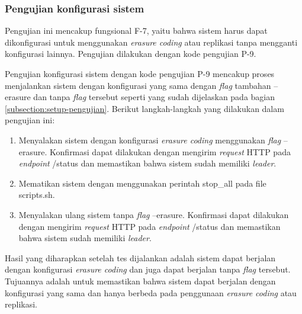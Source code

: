 \subsubsection{Pengujian konfigurasi sistem}
\label{subsubsection:pengujian-konfigurasi-sistem}

Pengujian ini mencakup fungsional F-7, yaitu bahwa sistem harus dapat dikonfigurasi untuk menggunakan \textit{erasure coding} atau replikasi tanpa mengganti konfigurasi lainnya. Pengujian dilakukan dengan kode pengujian P-9. 

Pengujian konfigurasi sistem dengan kode pengujian P-9 mencakup proses menjalankan sistem dengan konfigurasi yang sama dengan \textit{flag} tambahan --erasure dan tanpa \textit{flag} tersebut seperti yang sudah dijelaskan pada bagian \ref{subsection:setup-pengujian}. Berikut langkah-langkah yang dilakukan dalam pengujian ini:

\begin{enumerate}
  \item Menyalakan sistem dengan konfigurasi \textit{erasure coding} menggunakan \textit{flag} --erasure. Konfirmasi dapat dilakukan dengan mengirim \textit{request} HTTP pada \textit{endpoint} /status dan memastikan bahwa sistem sudah memiliki \textit{leader}.
  \item Mematikan sistem dengan menggunakan perintah stop\_all pada file scripts.sh.
  \item Menyalakan ulang sistem tanpa \textit{flag} --erasure. Konfirmasi dapat dilakukan dengan mengirim \textit{request} HTTP pada \textit{endpoint} /status dan memastikan bahwa sistem sudah memiliki \textit{leader}.
\end{enumerate}

Hasil yang diharapkan setelah tes dijalankan adalah sistem dapat berjalan dengan konfigurasi \textit{erasure coding} dan juga dapat berjalan tanpa \textit{flag} tersebut. Tujuannya adalah untuk memastikan bahwa sistem dapat berjalan dengan konfigurasi yang sama dan hanya berbeda pada penggunaan \textit{erasure coding} atau replikasi.